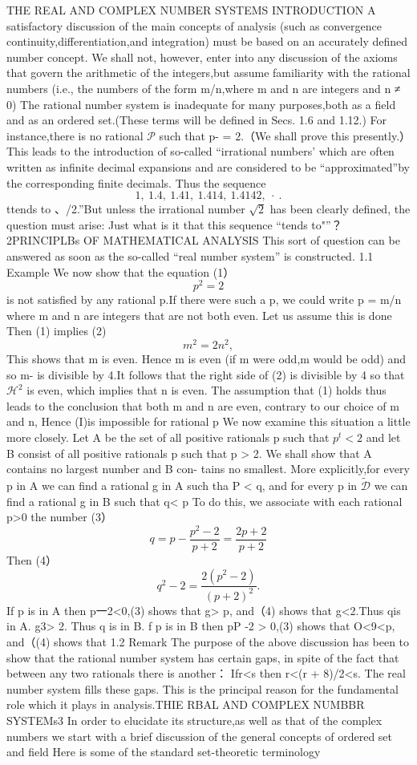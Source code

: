THE REAL AND COMPLEX NUMBER SYSTEMS INTRODUCTION A satisfactory discussion of the main concepts of analysis (such as convergence continuity,differentiation,and integration) must be based on an accurately defined number concept. We shall not, however, enter into any discussion of the axioms that govern the arithmetic of the integers,but assume familiarity with the rational numbers (i.e., the numbers of the form m/n,where m and n are integers and n ≠ 0) The rational number system is inadequate for many purposes,both as a field and as an ordered set.(These terms will be defined in Secs. 1.6 and 1.12.) For instance,there is no rational $\textstyle{\mathcal{P}}$ such that p- = 2.（We shall prove this presently.）This leads to the introduction of so-called “irrational numbers' which are often written as infinite decimal expansions and are considered to be “approximated”by the corresponding finite decimals. Thus the sequence $$ 1,\ 1.4,\ 1.41,\ 1.414,\ 1.4142,\ \cdot\ . $$ ttends to 、/2.”But unless the irrational number $\sqrt{2}$ has been clearly defined, the question must arise: Just what is it that this sequence “tends to"”？2PRINCIPLBs OF MATHEMATICAL ANALYSIS This sort of question can be answered as soon as the so-called “real number system” is constructed. 1.1 Example We now show that the equation (1） $$ p^{2}=2 $$ is not satisfied by any rational p.If there were such a p, we could write p = m/n where m and n are integers that are not both even. Let us assume this is done Then (1) implies (2) $$ m^{2}=2n^{2}, $$ This shows that m is even. Hence m is even (if m were odd,m would be odd) and so m- is divisible by 4.It follows that the right side of (2) is divisible by 4 so that $\mathcal{H}^{2}$ is even, which implies that n is even. The assumption that (1) holds thus leads to the conclusion that both m and n are even, contrary to our choice of m and n, Hence (I)is impossible for rational p We now examine this situation a little more closely. Let A be the set of all positive rationals p such that $p^{t}<2$ and let B consist of all positive rationals p such that p > 2. We shall show that A contains no largest number and B con- tains no smallest. More explicitly,for every p in A we can find a rational g in A such tha P < q, and for every p in ${\widetilde{\mathcal{D}}}$ we can find a rational g in B such that q< p To do this, we associate with each rational p>0 the number (3） $$ q=p-{\frac{p^{2}-2}{p+2}}={\frac{2p+2}{p+2}} $$ Then (4） $$ q^{2}-2={\frac{2(p^{2}-2)}{(p+2)^{2}}}. $$ If p is in A then p一2<0,(3) shows that g> p, and（4) shows that g<2.Thus qis in A. g3> 2. Thus q is in B. f p is in B then pP -2 > 0,(3) shows that O<9<p, and（(4) shows that 1.2 Remark The purpose of the above discussion has been to show that the rational number system has certain gaps, in spite of the fact that between any two rationals there is another： Ifr<s then r<(r + 8)/2<s. The real number system fills these gaps. This is the principal reason for the fundamental role which it plays in analysis.THIE RBAL AND COMPLEX NUMBBR SYSTEMs3 In order to elucidate its structure,as well as that of the complex numbers we start with a brief discussion of the general concepts of ordered set and field Here is some of the standard set-theoretic terminology 